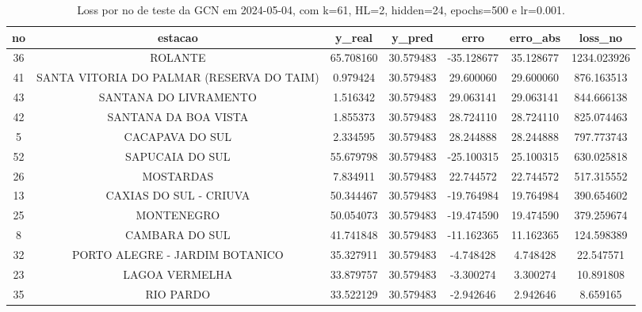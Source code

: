 \begin{table}[h]
\centering
\caption{Loss por no de teste da GCN em 2024-05-04, com k=61, HL=2, hidden=24, epochs=500 e lr=0.001.}
\label{tab:gcn_loss_k61_hl2_h24_e500_d20240504}
\begin{tabular}{ccccccc}
\toprule
no & estacao & y\_real & y\_pred & erro & erro\_abs & loss\_no \\
\midrule
36 & ROLANTE & 65.708160 & 30.579483 & -35.128677 & 35.128677 & 1234.023926 \\
41 & SANTA VITORIA DO PALMAR (RESERVA DO TAIM) & 0.979424 & 30.579483 & 29.600060 & 29.600060 & 876.163513 \\
43 & SANTANA DO LIVRAMENTO & 1.516342 & 30.579483 & 29.063141 & 29.063141 & 844.666138 \\
42 & SANTANA DA BOA VISTA & 1.855373 & 30.579483 & 28.724110 & 28.724110 & 825.074463 \\
5 & CACAPAVA DO SUL & 2.334595 & 30.579483 & 28.244888 & 28.244888 & 797.773743 \\
52 & SAPUCAIA DO SUL & 55.679798 & 30.579483 & -25.100315 & 25.100315 & 630.025818 \\
26 & MOSTARDAS & 7.834911 & 30.579483 & 22.744572 & 22.744572 & 517.315552 \\
13 & CAXIAS DO SUL - CRIUVA & 50.344467 & 30.579483 & -19.764984 & 19.764984 & 390.654602 \\
25 & MONTENEGRO & 50.054073 & 30.579483 & -19.474590 & 19.474590 & 379.259674 \\
8 & CAMBARA DO SUL & 41.741848 & 30.579483 & -11.162365 & 11.162365 & 124.598389 \\
32 & PORTO ALEGRE - JARDIM BOTANICO & 35.327911 & 30.579483 & -4.748428 & 4.748428 & 22.547571 \\
23 & LAGOA VERMELHA & 33.879757 & 30.579483 & -3.300274 & 3.300274 & 10.891808 \\
35 & RIO PARDO & 33.522129 & 30.579483 & -2.942646 & 2.942646 & 8.659165 \\
\bottomrule
\end{tabular}
\end{table}
